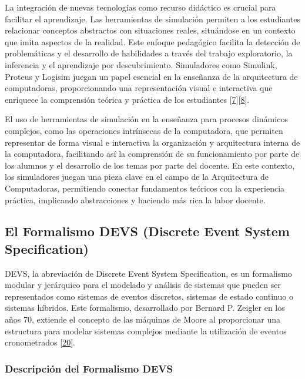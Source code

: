 \documentclass[12pt,twoside]{templates/unerthesis}
\begin{document}
La integración de nuevas tecnologías como recurso didáctico es crucial para facilitar el aprendizaje. Las herramientas de simulación permiten a los estudiantes relacionar conceptos abstractos con situaciones reales, situándose en un contexto que imita aspectos de la realidad. Este enfoque pedagógico facilita la detección de problemáticas y el desarrollo de habilidades a través del trabajo exploratorio, la inferencia y el aprendizaje por descubrimiento. Simuladores como Simulink, Proteus y Logisim juegan un papel esencial en la enseñanza de la arquitectura de computadoras, proporcionando una representación visual e interactiva que enriquece la comprensión teórica y práctica de los estudiantes {[}\protect\hyperlink{ref-garcia-garcia_pbbcache_2020}{7}{]}{[}\protect\hyperlink{ref-nova_tool_2013}{8}{]}.

El uso de herramientas de simulación en la enseñanza para procesos dinámicos complejos, como las operaciones intrínsecas de la computadora, que permiten representar de forma visual e interactiva la organización y arquitectura interna de la computadora, facilitando así la comprensión de su funcionamiento por parte de los alumnos y el desarrollo de los temas por parte del docente. En este contexto, los simuladores juegan una pieza clave en el campo de la Arquitectura de Computadoras, permitiendo conectar fundamentos teóricos con la experiencia práctica, implicando abstracciones y haciendo más rica la labor docente.

\hypertarget{el-formalismo-devs-discrete-event-system-specification}{%
\subsection{El Formalismo DEVS (Discrete Event System Specification)}\label{el-formalismo-devs-discrete-event-system-specification}}

DEVS, la abreviación de Discrete Event System Specification, es un formalismo modular y jerárquico para el modelado y análisis de sistemas que pueden ser representados como sistemas de eventos discretos, sistemas de estado continuo o sistemas híbridos. Este formalismo, desarrollado por Bernard P. Zeigler en los años 70, extiende el concepto de las máquinas de Moore al proporcionar una estructura para modelar sistemas complejos mediante la utilización de eventos cronometrados {[}\protect\hyperlink{ref-zeigler_theory_2000}{20}{]}.

\hypertarget{descripciuxf3n-del-formalismo-devs}{%
\subsubsection{Descripción del Formalismo DEVS}\label{descripciuxf3n-del-formalismo-devs}}
\end{document}
